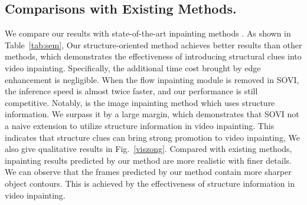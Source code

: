 \subsection{Comparisons with Existing Methods.}
We compare our results with state-of-the-art inpainting methods \cite{nazeri2019edgeconnect,wang2019video,Kim_2019_CVPR1,Xu_2019_CVPR}. 
As shown in Table~\ref{tab:sem}, Our structure-oriented method achieves better results than other methods, which demonstrates the effectiveness of introducing structural clues into video inpainting.
Specifically, the additional time cost brought by edge enhancement is negligible.
When the flow inpainting module is removed in SOVI, the inference speed is almost twice faster, and our performance is still competitive.
Notably, \cite{nazeri2019edgeconnect} is the image inpainting method which uses structure information. We surpass it by a large margin, which demonstrates that SOVI not a naive extension to utilize structure information in video inpainting.
This indicates that structure clues can bring strong promotion to video inpainting, 
We also give qualitative results in Fig.~\ref{viszong}. Compared with existing methods, inpainting results predicted by our method are more realistic with finer details. We can observe that the frames predicted by our method contain more sharper object contours. This is achieved by the effectiveness of structure information in video inpainting.









